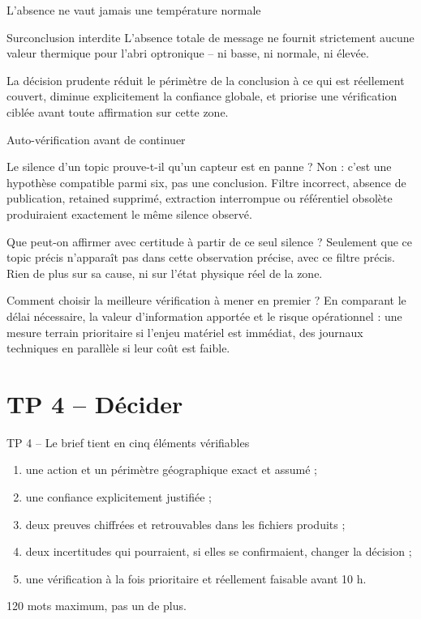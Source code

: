 \documentclass[aspectratio=169]{beamer}
\begin{document}
\begin{frame}{L'absence ne vaut jamais une température normale}
\begin{alertblock}{Surconclusion interdite}
L'absence totale de message ne fournit strictement aucune valeur thermique pour l'abri optronique -- ni basse, ni normale, ni élevée.
\end{alertblock}
La décision prudente réduit le périmètre de la conclusion à ce qui est réellement couvert, diminue explicitement la confiance globale, et priorise une vérification ciblée avant toute affirmation sur cette zone.
\end{frame}

\begin{frame}{Auto-vérification avant de continuer}
\small
\begin{block}{Le silence d'un topic prouve-t-il qu'un capteur est en panne ?}
Non : c'est une hypothèse compatible parmi six, pas une conclusion. Filtre incorrect, absence de publication, retained supprimé, extraction interrompue ou référentiel obsolète produiraient exactement le même silence observé.
\end{block}
\begin{block}{Que peut-on affirmer avec certitude à partir de ce seul silence ?}
Seulement que ce topic précis n'apparaît pas dans cette observation précise, avec ce filtre précis. Rien de plus sur sa cause, ni sur l'état physique réel de la zone.
\end{block}
\begin{block}{Comment choisir la meilleure vérification à mener en premier ?}
En comparant le délai nécessaire, la valeur d'information apportée et le risque opérationnel : une mesure terrain prioritaire si l'enjeu matériel est immédiat, des journaux techniques en parallèle si leur coût est faible.
\end{block}
\end{frame}

\section{TP 4 -- Décider}
\begin{frame}{TP 4 -- Le brief tient en cinq éléments vérifiables}
\begin{enumerate}
\item une action et un périmètre géographique exact et assumé ;
\item une confiance explicitement justifiée ;
\item deux preuves chiffrées et retrouvables dans les fichiers produits ;
\item deux incertitudes qui pourraient, si elles se confirmaient, changer la décision ;
\item une vérification à la fois prioritaire et réellement faisable avant 10 h.
\end{enumerate}
120 mots maximum, pas un de plus.
\end{frame}
\end{document}
